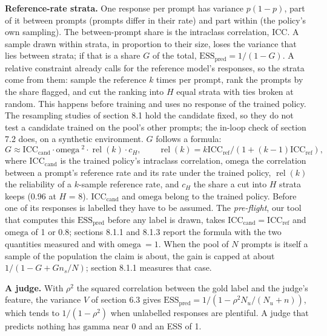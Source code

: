 \documentclass[11pt]{article}
\begin{document}
\textbf{Reference-rate strata.} One response per prompt has variance $p (1 - p )$, part of it between prompts (prompts differ in their rate) and part within (the policy's own sampling). The between-prompt share is the intraclass correlation, ICC. A sample drawn within strata, in proportion to their size, loses the variance that lies between strata; if that is a share $G$ of the total, $\mathrm{ESS}_{\mathrm{pred}} = 1 / (1 - G )$. A relative constraint already calls for the reference model's responses, so the strata come from them: sample the reference $k$ times per prompt, rank the prompts by the share flagged, and cut the ranking into $H$ equal strata with ties broken at random. This happens before training and uses no response of the trained policy. The resampling studies of section 8.1 hold the candidate fixed, so they do not test a candidate trained on the pool's other prompts; the in-loop check of section 7.2 does, on a synthetic environment. $G$ follows a formula:
\[
G \approx \mathrm{ICC}_{\mathrm{cand}} \cdot \text{omega}\ ^{2} \cdot \operatorname{rel} (k ) \cdot c_{H} ,\qquad \operatorname{rel} (k ) = k \mathrm{ICC}_{\mathrm{ref}} / (1 + (k - 1) \mathrm{ICC}_{\mathrm{ref}} ),
\]
where $\mathrm{ICC}_{\mathrm{cand}}$ is the trained policy's intraclass correlation, $\text{omega}$ the correlation between a prompt's reference rate and its rate under the trained policy, $\operatorname{rel} (k )$ the reliability of a $k$-sample reference rate, and $c_{H}$ the share a cut into $H$ strata keeps (0.96 at $H$ = 8). $\mathrm{ICC}_{\mathrm{cand}}$ and $\text{omega}$ belong to the trained policy. Before one of its responses is labelled they have to be assumed. The \emph{pre-flight}, our tool that computes this $\mathrm{ESS}_{\mathrm{pred}}$ before any label is drawn, takes $\mathrm{ICC}_{\mathrm{cand}} = \mathrm{ICC}_{\mathrm{ref}}$ and $\text{omega}$ of 1 or 0.8; sections 8.1.1 and 8.1.3 report the formula with the two quantities measured and with $\text{omega}\ = 1$. When the pool of $N$ prompts is itself a sample of the population the claim is about, the gain is capped at about $1 / (1 - G + G n_{s} / N )$; section 8.1.1 measures that case.


\textbf{A judge.} With $\rho ^{2}$ the squared correlation between the gold label and the judge's feature, the variance $V$ of section 6.3 gives $\mathrm{ESS}_{\mathrm{pred}} = 1 / ( 1 - \rho ^{2} N_{u} / (N_{u} + n ) )$, which tends to $1 / (1 - \rho ^{2})$ when unlabelled responses are plentiful. A judge that predicts nothing has $\text{gamma}$ near 0 and an ESS of 1.
\end{document}
